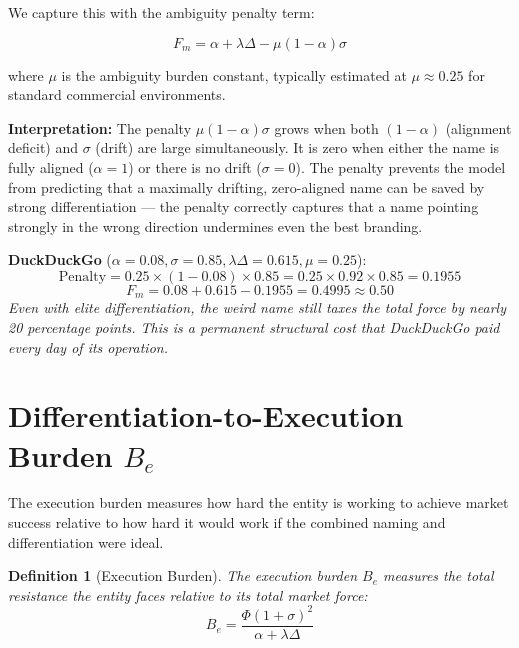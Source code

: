 \documentclass[12pt, openany]{book}
\theoremstyle{thmstyle}
\theoremstyle{defstyle}
\newtheorem{definition}{Definition}[chapter]
\begin{document}
We capture this with the ambiguity penalty term:

\begin{equation}
F_m = \alpha + \lambda\Delta - \mu(1-\alpha)\sigma
\label{eq:market_force_full}
\end{equation}

where $\mu$ is the ambiguity burden constant, typically estimated at $\mu \approx 0.25$ for standard commercial environments.

\textbf{Interpretation:} The penalty $\mu(1-\alpha)\sigma$ grows when both $(1-\alpha)$ (alignment deficit) and $\sigma$ (drift) are large simultaneously. It is zero when either the name is fully aligned ($\alpha = 1$) or there is no drift ($\sigma = 0$). The penalty prevents the model from predicting that a maximally drifting, zero-aligned name can be saved by strong differentiation --- the penalty correctly captures that a name pointing strongly in the wrong direction undermines even the best branding.

\begin{calcbox}
\textbf{DuckDuckGo} ($\alpha = 0.08, \sigma = 0.85, \lambda\Delta = 0.615, \mu = 0.25$):
\[
\text{Penalty} = 0.25 \times (1 - 0.08) \times 0.85 = 0.25 \times 0.92 \times 0.85 = 0.1955
\]
\[
F_m = 0.08 + 0.615 - 0.1955 = 0.4995 \approx 0.50
\]
\textit{Even with elite differentiation, the weird name still taxes the total force by nearly 20 percentage points. This is a permanent structural cost that DuckDuckGo paid every day of its operation.}
\end{calcbox}

\section{Differentiation-to-Execution Burden $B_e$}

The execution burden measures how hard the entity is working to achieve market success relative to how hard it would work if the combined naming and differentiation were ideal.

\begin{definition}[Execution Burden]
The execution burden $B_e$ measures the total resistance the entity faces relative to its total market force:
\begin{equation}
B_e = \frac{\Phi(1+\sigma)^2}{\alpha + \lambda\Delta}
\label{eq:exec_burden}
\end{equation}
\end{definition}
\end{document}
